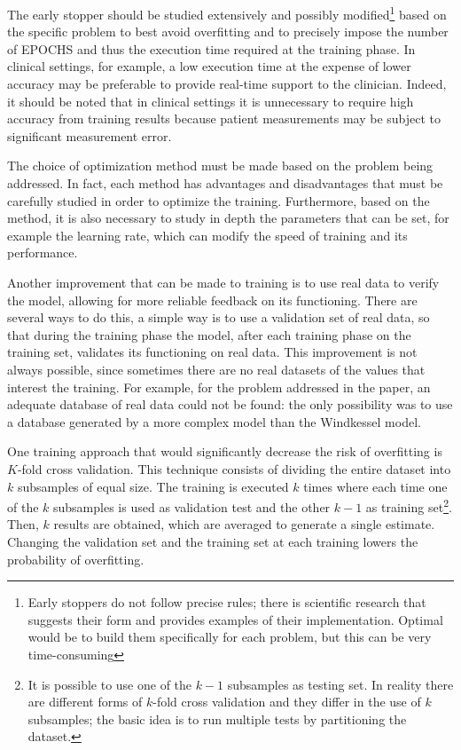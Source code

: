 The early stopper should be studied extensively and possibly modified\footnote{Early stoppers do not follow precise rules; there is scientific research that suggests their form and provides examples of their implementation. Optimal would be to build them specifically for each problem, but this can be very time-consuming} based on the specific problem to best avoid overfitting and to precisely impose the number of EPOCHS and thus the execution time required at the training phase. In clinical settings, for example, a low execution time at the expense of lower accuracy may be preferable to provide real-time support to the clinician. Indeed, it should be noted that in clinical settings it is unnecessary to require high accuracy from training results because patient measurements may be subject to significant measurement error.

The choice of optimization method must be made based on the problem being addressed. In fact, each method has advantages and disadvantages that must be carefully studied in order to optimize the training. Furthermore, based on the method, it is also necessary to study in depth the parameters that can be set, for example the learning rate, which can modify the speed of training and its performance.


Another improvement that can be made to training is to use real data to verify the model, allowing for more reliable feedback on its functioning. There are several ways to do this, a simple way is to use a validation set of real data, so that during the training phase the model, after each training phase on the training set, validates its functioning on real data. This improvement is not always possible, since sometimes there are no real datasets of the values that interest the training. For example, for the problem addressed in the paper, an adequate database of real data could not be found: the only possibility was to use a database generated by a more complex model than the Windkessel model.

One training approach that would significantly decrease the risk of overfitting is $K$-fold cross validation. This technique consists of dividing the entire dataset into $k$ subsamples of equal size. The training is executed $k$ times where each time one of the $k$ subsamples is used as validation test and the other $k-1$ as training set\footnote{It is possible to use one of the $k-1$ subsamples as testing set. In reality there are different forms of $k$-fold cross validation and they differ in the use of $k$ subsamples; the basic idea is to run multiple tests by partitioning the dataset.}. Then, $k$ results are obtained, which are averaged to generate a single estimate. Changing the validation set and the training set at each training lowers the probability of overfitting.

